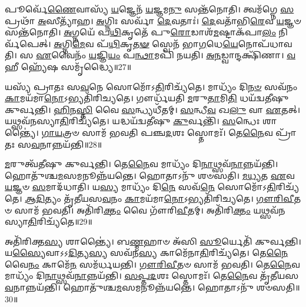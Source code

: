 𑌪𑍂𑌰𑍍𑌵𑍇᳴\-\ul{𑌣𑍈}\-𑌵𑌾𑌸𑍍𑌯᳴ \ul{𑌯}\-𑌜𑍍𑌞𑍇𑌨᳴ \ul{𑌯}\-𑌜𑍍𑌞𑌮\-\ul{𑌨𑍁} 𑌸𑌨𑍍𑌤᳴𑌨𑍋𑌤𑌿।
𑌤𑍍𑌵𑌮᳴𑌗𑍍𑌨𑍇 \ul{𑌸}\-𑌪𑍍𑌰𑌥𑌾᳴ \ul{𑌅}\-𑌸𑍀𑌤𑍍𑌯𑌾᳴𑌹।
\-\ul{𑌅}\-𑌗𑍍𑌨𑌿𑌃 𑌸𑌰𑍍𑌵𑌾᳴ \ul{𑌦𑍇}\-𑌵𑌤𑌾𑌃॑।
\-\ul{𑌦𑍇}\-𑌵𑌤𑌾᳴𑌭𑌿\-\ul{𑌰𑍇}\-𑌵 \ul{𑌯}\-𑌜𑍍𑌞𑍞 𑌸𑌨𑍍𑌤᳴𑌨𑍋𑌤𑌿।
\-\ul{𑌅}\-𑌗𑍍𑌨𑌯𑍇᳴ 𑌪\-\ul{𑌥𑌿}\-𑌕𑍃𑌤𑍇᳴ 𑌪𑍁\-\ul{𑌰𑍋}\-𑌡𑌾𑌶᳴\-\ul{𑌮}\-𑌷𑍍𑌟𑌾\-𑌕᳴𑌪𑌾\-\ul{𑌲𑌂} 𑌨𑌿𑌰𑍍𑌵᳴𑌪𑍇𑌤𑍍।
\-\ul{𑌅}\-𑌗𑍍𑌨𑌿\-\ul{𑌮𑍇}\-𑌵 𑌪᳴\-\ul{𑌥𑌿}\-𑌕𑍃\-\ul{𑌤}\-\-\ul{𑍟} 𑌸𑍍𑌵𑍇𑌨᳴ 𑌭𑌾\-\ul{𑌗}\-𑌧𑍇\-\ul{𑌯𑍇}\-𑌨𑍋𑌪᳴𑌧𑌾𑌵𑌤𑌿।
𑌸 \ul{𑌏}\-𑌵𑍈𑌨𑌂᳴ \ul{𑌯}\-𑌜𑍍𑌞𑌿\-\ul{𑌯𑌂} 𑌪\-\ul{𑌨𑍍𑌥𑌾}\-𑌮𑌪𑌿᳴ 𑌨𑌯𑌤𑌿।
\-\ul{𑌅}\-\-\ul{𑌨}\-𑌡𑍍𑌵𑌾𑌨𑍍𑌦𑌕𑍍𑌷𑌿᳴𑌣𑌾।
\-\ul{𑌵}\-𑌹𑍀 𑌹𑍍𑌯𑍇᳴𑌷 𑌸𑌮𑍃᳴𑌦𑍍𑌧𑍍𑌯𑍈॥27॥

𑌯𑌸𑍍𑌯᳴ 𑌪𑍍𑌰𑌾𑌤𑌃 𑌸\-\ul{𑌵}\-𑌨𑍇 𑌸𑍋𑌮𑍋᳴\-𑌽\-\ul{𑌤𑌿}\-𑌰𑌿𑌚𑍍𑌯᳴𑌤𑍇।
𑌮𑌾𑌧𑍍𑌯𑌂᳴ 𑌦𑌿\-\ul{𑌨}\-\-\ul{𑍞} 𑌸𑌵᳴𑌨𑌂 \ul{𑌕𑌾}\-𑌮𑌯᳴𑌮𑌾\-\ul{𑌨𑍋}\-\-𑌽𑌭𑍍𑌯𑌤𑌿᳴𑌰𑌿𑌚𑍍𑌯𑌤𑍇।
𑌗𑍗𑌰𑍍𑌧᳴𑌯𑌤𑌿 \ul{𑌮}\-𑌰𑍁\-\ul{𑌤𑌾}\-𑌮𑌿\-\ul{𑌤𑌿} 𑌧𑌯᳴𑌦𑍍𑌵𑌤𑍀𑌷𑍁 𑌕𑍁𑌰𑍍𑌵𑌨𑍍𑌤𑌿।
\-\ul{𑌹𑌿}\-𑌨\-\ul{𑌸𑍍𑌤𑌿} 𑌵𑍈 \ul{𑌸}\-𑌨𑍍𑌧𑍍𑌯𑌧𑍀᳴𑌤𑌮𑍍।
\-\ul{𑌸}\-𑌨𑍍𑌧𑍀\-\ul{𑌵} 𑌖\-\ul{𑌲𑍁} 𑌵𑌾 \ul{𑌏}\-𑌤𑌤𑍍।
𑌯𑌥𑍍𑌸𑌵᳴𑌨𑌸𑍍𑌯𑌾\-\ul{𑌤𑌿}\-𑌰𑌿𑌚𑍍𑌯᳴𑌤𑍇।
𑌯𑌦𑍍𑌧𑌯᳴𑌦𑍍𑌵𑌤𑍀𑌷𑍁 \ul{𑌕𑍁}\-𑌰𑍍𑌵𑌨𑍍𑌤𑌿᳴।
\-\ul{𑌸}\-𑌨𑍍𑌧𑍇𑌃 𑌶𑌾𑌨𑍍𑌤𑍍𑌯𑍈॑।
\-\ul{𑌗𑌾}\-\-\ul{𑌯}\-𑌤𑍍𑌰𑍞 𑌸𑌾𑌮᳴ 𑌭𑌵𑌤𑌿 𑌪𑌞𑍍𑌚\-\ul{𑌦}\-𑌶𑌃 𑌸𑍍𑌤𑍋𑌮𑌃᳴।
𑌤𑍇\-\ul{𑌨𑍈}\-𑌵 𑌪𑍍𑌰𑌾᳴𑌤𑌃 𑌸\-\ul{𑌵}\-𑌨𑌾𑌨𑍍𑌨𑌯᳴𑌨𑍍𑌤𑌿॥28॥

\-\ul{𑌮}\-𑌰𑍁𑌤𑍍𑌵᳴𑌤𑍀𑌷𑍁 𑌕𑍁𑌰𑍍𑌵𑌨𑍍𑌤𑌿।
𑌤𑍇\-\ul{𑌨𑍈}\-𑌵 𑌮𑌾𑌧𑍍𑌯𑌂᳴ 𑌦𑌿\-\ul{𑌨𑌾}\-𑌥𑍍𑌸𑌵᳴\-\ul{𑌨𑌾}\-𑌨𑍍𑌨𑌯᳴𑌨𑍍𑌤𑌿।
𑌹𑍋𑌤𑍁᳴𑌶𑍍𑌚\-\ul{𑌮}\-𑌸𑌮𑌨𑍂𑌨𑍍𑌨᳴𑌯𑌨𑍍𑌤𑍇।
𑌹𑍋𑌤𑌾𑌽𑌨𑍁᳴ 𑌶𑍞𑌸𑌤𑌿।
\-\ul{𑌮}\-\-\ul{𑌧𑍍𑌯}\-𑌤 \ul{𑌏}\-𑌵 \ul{𑌯}\-𑌜𑍍𑌞𑍞 \ul{𑌸}\-𑌮𑌾𑌦᳴𑌧𑌾𑌤𑌿।
𑌯\-\ul{𑌸𑍍𑌯} 𑌮𑌾𑌧𑍍𑌯𑌂᳴ 𑌦𑌿\-\ul{𑌨𑍇} 𑌸𑌵᳴\-\ul{𑌨𑍇} 𑌸𑍋𑌮𑍋᳴\-𑌽\-\ul{𑌤𑌿}\-𑌰𑌿𑌚𑍍𑌯᳴𑌤𑍇।
\-\ul{𑌆}\-\-\ul{𑌦𑌿}\-𑌤𑍍𑌯𑌂 𑌤𑍃᳴𑌤𑍀𑌯𑌸\-\ul{𑌵}\-𑌨𑌂 \ul{𑌕𑌾}\-𑌮𑌯᳴𑌮𑌾\-\ul{𑌨𑍋}\-\-𑌽𑌭𑍍𑌯𑌤𑌿᳴𑌰𑌿𑌚𑍍𑌯𑌤𑍇।
\-\ul{𑌗𑍗}\-\-\ul{𑌰𑌿}\-\-\ul{𑌵𑍀}\-𑌤𑍞 𑌸𑌾𑌮᳴ 𑌭𑌵𑌤𑌿।
𑌅𑌤𑌿᳴𑌰𑌿\-\ul{𑌕𑍍𑌤𑌂} 𑌵𑍈 𑌗𑍗᳴𑌰𑌿\-\ul{𑌵𑍀}\-𑌤𑌮𑍍।
𑌅𑌤𑌿᳴𑌰𑌿\-\ul{𑌕𑍍𑌤𑌂} 𑌯𑌥𑍍𑌸𑌵᳴𑌨𑌸𑍍𑌯𑌾\-\ul{𑌤𑌿}\-𑌰𑌿𑌚𑍍𑌯᳴𑌤𑍇॥29॥

𑌅𑌤𑌿᳴𑌰𑌿𑌕𑍍𑌤\-\ul{𑌸𑍍𑌯} 𑌶𑌾𑌨𑍍𑌤𑍍𑌯𑍈॑।
𑌬\-\ul{𑌣𑍍𑌮}\-𑌹𑌾𑍞 𑌅᳴𑌸𑌿 \ul{𑌸𑍂}\-𑌰𑍍𑌯𑍇𑌤𑌿᳴ 𑌕𑍁𑌰𑍍𑌵𑌨𑍍𑌤𑌿।
𑌯\-\ul{𑌸𑍍𑌯𑍈}\-𑌵𑌾\-𑌽𑌽\-\ul{𑌦𑌿}\-𑌤𑍍𑌯\-\ul{𑌸𑍍𑌯} 𑌸𑌵᳴𑌨\-\ul{𑌸𑍍𑌯} 𑌕𑌾𑌮𑍇᳴𑌨𑌾\-\ul{𑌤𑌿}\-𑌰𑌿𑌚𑍍𑌯᳴𑌤𑍇।
𑌤𑍇\-\ul{𑌨𑍈}\-𑌵𑍈\-\ul{𑌨𑌂} 𑌕𑌾𑌮𑍇᳴\-\ul{𑌨} 𑌸𑌮᳴𑌰𑍍𑌧𑌯𑌨𑍍𑌤𑌿।
\-\ul{𑌗𑍗}\-\-\ul{𑌰𑌿}\-\-\ul{𑌵𑍀}\-𑌤𑍞 𑌸𑌾𑌮᳴ 𑌭𑌵𑌤𑌿।
𑌤𑍇\-\ul{𑌨𑍈}\-𑌵 𑌮𑌾𑌧𑍍𑌯𑌂᳴ 𑌦𑌿\-\ul{𑌨𑌾}\-𑌥𑍍𑌸𑌵᳴\-\ul{𑌨𑌾}\-𑌨𑍍𑌨𑌯᳴𑌨𑍍𑌤𑌿।
\-\ul{𑌸}\-\-\ul{𑌪𑍍𑌤}\-\-\ul{𑌦}\-𑌶𑌃 𑌸𑍍𑌤𑍋𑌮𑌃᳴।
𑌤𑍇\-\ul{𑌨𑍈}\-𑌵 𑌤𑍃᳴𑌤𑍀𑌯𑌸\-\ul{𑌵}\-𑌨𑌾𑌨𑍍𑌨𑌯᳴𑌨𑍍𑌤𑌿।
𑌹𑍋𑌤𑍁᳴𑌶𑍍𑌚\-\ul{𑌮}\-𑌸𑌮𑌨𑍂𑌨𑍍𑌨᳴𑌯𑌨𑍍𑌤𑍇।
𑌹𑍋𑌤𑌾𑌽𑌨𑍁᳴ 𑌶𑍞𑌸𑌤𑌿॥30॥

